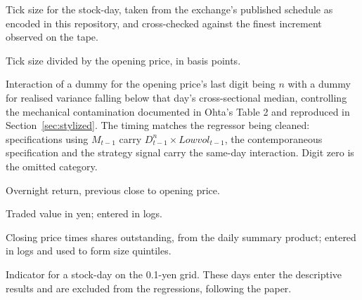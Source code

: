 \begin{description}[leftmargin=6.5em, style=nextline, nosep, font=\normalfont\itshape]
\item[$\tau$] Tick size for the stock-day, taken from the exchange's published
  schedule \parencite{JPX2024TickSize} as encoded in this repository, and
  cross-checked against the finest increment observed on the tape.
\item[$\mathit{RelTick}$] Tick size divided by the opening price, in basis points.
\item[$D^{n} \times \mathit{Lowvol}$] Interaction of a dummy for the opening
  price's last digit being $n$ with a dummy for realised variance falling
  below that day's cross-sectional median, controlling the mechanical
  contamination documented in Ohta's Table 2 and reproduced in
  Section~\ref{sec:stylized}. The timing matches the regressor being cleaned:
  specifications using $M_{t-1}$ carry $D^{n}_{t-1} \times
  \mathit{Lowvol}_{t-1}$, the contemporaneous specification and the strategy
  signal carry the same-day interaction. Digit zero is the omitted category.
\item[$\mathit{ret}^{\mathrm{on}}$] Overnight return, previous close to opening
  price.
\item[$\mathit{Turnover}$] Traded value in yen; entered in logs.
\item[$\mathit{MktCap}$] Closing price times shares outstanding, from the daily
  summary product; entered in logs and used to form size quintiles.
\item[$\mathit{FineTick}$] Indicator for a stock-day on the 0.1-yen grid. These
  days enter the descriptive results and are excluded from the regressions,
  following the paper.
\end{description}
